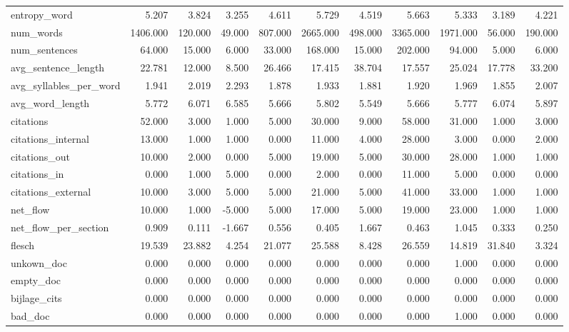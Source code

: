 \begin{tabular}{lrrrrrrrrrr}
\cline{1-11}
entropy\_word & 5.207 & 3.824 & 3.255 & 4.611 & 5.729 & 4.519 & 5.663 & 5.333 & 3.189 & 4.221 \\
\cline{1-11}
num\_words & 1406.000 & 120.000 & 49.000 & 807.000 & 2665.000 & 498.000 & 3365.000 & 1971.000 & 56.000 & 190.000 \\
\cline{1-11}
num\_sentences & 64.000 & 15.000 & 6.000 & 33.000 & 168.000 & 15.000 & 202.000 & 94.000 & 5.000 & 6.000 \\
\cline{1-11}
avg\_sentence\_length & 22.781 & 12.000 & 8.500 & 26.466 & 17.415 & 38.704 & 17.557 & 25.024 & 17.778 & 33.200 \\
\cline{1-11}
avg\_syllables\_per\_word & 1.941 & 2.019 & 2.293 & 1.878 & 1.933 & 1.881 & 1.920 & 1.969 & 1.855 & 2.007 \\
\cline{1-11}
avg\_word\_length & 5.772 & 6.071 & 6.585 & 5.666 & 5.802 & 5.549 & 5.666 & 5.777 & 6.074 & 5.897 \\
\cline{1-11}
citations & 52.000 & 3.000 & 1.000 & 5.000 & 30.000 & 9.000 & 58.000 & 31.000 & 1.000 & 3.000 \\
\cline{1-11}
citations\_internal & 13.000 & 1.000 & 1.000 & 0.000 & 11.000 & 4.000 & 28.000 & 3.000 & 0.000 & 2.000 \\
\cline{1-11}
citations\_out & 10.000 & 2.000 & 0.000 & 5.000 & 19.000 & 5.000 & 30.000 & 28.000 & 1.000 & 1.000 \\
\cline{1-11}
citations\_in & 0.000 & 1.000 & 5.000 & 0.000 & 2.000 & 0.000 & 11.000 & 5.000 & 0.000 & 0.000 \\
\cline{1-11}
citations\_external & 10.000 & 3.000 & 5.000 & 5.000 & 21.000 & 5.000 & 41.000 & 33.000 & 1.000 & 1.000 \\
\cline{1-11}
net\_flow & 10.000 & 1.000 & -5.000 & 5.000 & 17.000 & 5.000 & 19.000 & 23.000 & 1.000 & 1.000 \\
\cline{1-11}
net\_flow\_per\_section & 0.909 & 0.111 & -1.667 & 0.556 & 0.405 & 1.667 & 0.463 & 1.045 & 0.333 & 0.250 \\
\cline{1-11}
flesch & 19.539 & 23.882 & 4.254 & 21.077 & 25.588 & 8.428 & 26.559 & 14.819 & 31.840 & 3.324 \\
\cline{1-11}
unkown\_doc & 0.000 & 0.000 & 0.000 & 0.000 & 0.000 & 0.000 & 0.000 & 1.000 & 0.000 & 0.000 \\
\cline{1-11}
empty\_doc & 0.000 & 0.000 & 0.000 & 0.000 & 0.000 & 0.000 & 0.000 & 0.000 & 0.000 & 0.000 \\
\cline{1-11}
bijlage\_cits & 0.000 & 0.000 & 0.000 & 0.000 & 0.000 & 0.000 & 0.000 & 0.000 & 0.000 & 0.000 \\
\cline{1-11}
bad\_doc & 0.000 & 0.000 & 0.000 & 0.000 & 0.000 & 0.000 & 0.000 & 1.000 & 0.000 & 0.000 \\
\cline{1-11}
\bottomrule
\end{tabular}

